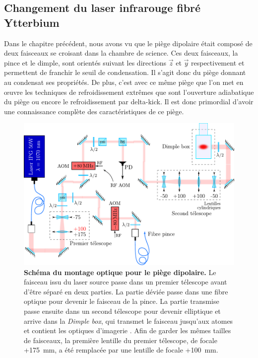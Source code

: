 \subsection{Changement du laser infrarouge fibré Ytterbium }
Dans le chapitre précédent, nous avons vu que le piège dipolaire était composé de deux faisceaux se croisant dans la chambre de science. Ces deux faisceaux, la pince et le dimple, sont orientés suivant les directions $\vec{z}$ et $\vec{y}$ respectivement et permettent de franchir le seuil de condensation. Il s'agit donc du piège donnant au condensat ses propriétés. De plus, c'est avec ce même piège que l'on met en œuvre les techniques de refroidissement extrêmes que sont l'ouverture adiabatique du piège ou encore le refroidissement par delta-kick. Il est donc primordial d'avoir une connaissance complète des caractéristiques de ce piège.

\begin{figure}
\centering
\includegraphics[width=\textwidth]{Fig/Modif_exp/optique_1070_new_style.pdf}
\caption{\textbf{Schéma du montage optique pour le piège dipolaire.} Le faisceau issu du laser source passe dans un premier télescope avant d'être séparé en deux parties. La partie déviée passe dans une fibre optique pour devenir le faisceau de la pince. La partie transmise passe ensuite dans un second télescope pour devenir elliptique et arrive dans la \emph{Dimple box}, qui transmet le faisceau jusqu'aux atomes et contient les optiques d'imagerie \citep{muller2015coherent}. Afin de garder les mêmes tailles de faisceaux, la première lentille du premier télescope, de focale +\SI{175}{\milli\metre}, a été remplacée par une lentille de focale +\SI{100}{\milli\metre}.}
\label{fig:optique_1070}
\end{figure}


